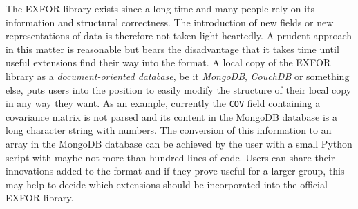 \documentclass[12pt,a4paper]{scrartcl}
\begin{document}
The EXFOR library exists since a long time and many people rely on its information and structural correctness.
The introduction of new fields or new representations of data is therefore not taken light-heartedly.
A prudent approach in this matter is reasonable but bears the disadvantage that it takes time until useful extensions find their way into the format.
A local copy of the EXFOR library as a \textit{document-oriented database}, be it \textit{MongoDB}, \textit{CouchDB} or something else, puts users into the position to easily modify the structure of their local copy in any way they want.
As an example, currently the \verb|COV| field containing a covariance matrix is not parsed and its content in the MongoDB database is a long character string with numbers.
The conversion of this information to an array in the MongoDB database can be achieved by the user with a small Python script with maybe not more than hundred lines of code.
Users can share their innovations added to the format and if they prove useful for a larger group, this may help to decide which extensions should be incorporated into the official EXFOR library.
 
\end{document}
